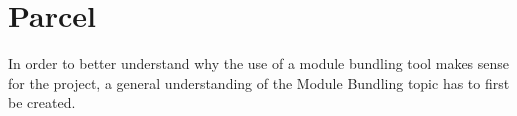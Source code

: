 \section{Parcel}
\label{sec:tecParcel}
%
% 
In order to better understand why the use of a module bundling tool makes sense for the project, a general understanding of the Module Bundling topic has to first be created.

